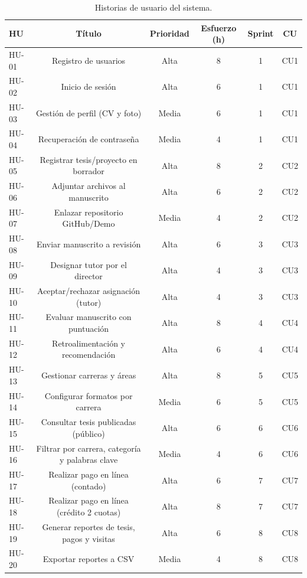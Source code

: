 \medskip
\noindent
\begin{table}[H]
\centering
\caption{Historias de usuario del sistema.}
\label{tab:hu}
\begin{tabular}{lccccc}
\toprule
\textbf{HU} & \textbf{Título} & \textbf{Prioridad} & \textbf{Esfuerzo (h)} & \textbf{Sprint} & \textbf{CU} \\
\midrule
HU-01 & Registro de usuarios & Alta & 8 & 1 & CU1 \\
HU-02 & Inicio de sesión & Alta & 6 & 1 & CU1 \\
HU-03 & Gestión de perfil (CV y foto) & Media & 6 & 1 & CU1 \\
HU-04 & Recuperación de contraseña & Media & 4 & 1 & CU1 \\
HU-05 & Registrar tesis/proyecto en borrador & Alta & 8 & 2 & CU2 \\
HU-06 & Adjuntar archivos al manuscrito & Alta & 6 & 2 & CU2 \\
HU-07 & Enlazar repositorio GitHub/Demo & Media & 4 & 2 & CU2 \\
HU-08 & Enviar manuscrito a revisión & Alta & 6 & 3 & CU3 \\
HU-09 & Designar tutor por el director & Alta & 4 & 3 & CU3 \\
HU-10 & Aceptar/rechazar asignación (tutor) & Alta & 4 & 3 & CU3 \\
HU-11 & Evaluar manuscrito con puntuación & Alta & 8 & 4 & CU4 \\
HU-12 & Retroalimentación y recomendación & Alta & 6 & 4 & CU4 \\
HU-13 & Gestionar carreras y áreas & Alta & 8 & 5 & CU5 \\
HU-14 & Configurar formatos por carrera & Media & 6 & 5 & CU5 \\
HU-15 & Consultar tesis publicadas (público) & Alta & 6 & 6 & CU6 \\
HU-16 & Filtrar por carrera, categoría y palabras clave & Media & 4 & 6 & CU6 \\
HU-17 & Realizar pago en línea (contado) & Alta & 6 & 7 & CU7 \\
HU-18 & Realizar pago en línea (crédito 2 cuotas) & Alta & 8 & 7 & CU7 \\
HU-19 & Generar reportes de tesis, pagos y visitas & Alta & 6 & 8 & CU8 \\
HU-20 & Exportar reportes a CSV & Media & 4 & 8 & CU8 \\
\bottomrule
\end{tabular}
\end{table}
\medskip

